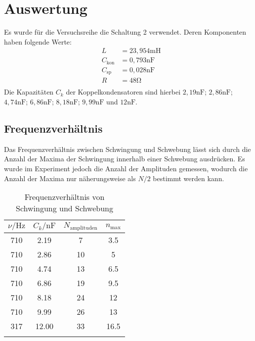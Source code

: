 \section{Auswertung}
\label{sec:Auswertung}

Es wurde für die Versuchsreihe die Schaltung 2 verwendet. Deren Komponenten haben folgende Werte:
\begin{align*}
& L & = 23,954 \si{\milli\henry} \\
& C_\text{kon} & = 0,793 \si{\nano\farad} \\
& C_\text{sp} & = 0,028 \si{\nano\farad} \\
& R & = 48 \si{\ohm} \\
\end{align*}
Die Kapazitäten $C_k$ der Koppelkondensatoren sind hierbei $2,19 \si{\nano\farad}$; $2,86 \si{\nano\farad}$;
$4,74 \si{\nano\farad}$; $6,86 \si{\nano\farad}$; $8,18 \si{\nano\farad}$; $9,99 \si{\nano\farad}$ und
$12 \si{\nano\farad}$.

\subsection{Frequenzverhältnis}
Das Frequenzverhältnis zwischen Schwingung und Schwebung lässt sich durch die Anzahl der Maxima der Schwingung innerhalb
einer Schwebung ausdrücken. Es wurde im Experiment jedoch die Anzahl der Amplituden gemessen, wodurch die Anzahl der 
Maxima nur näherungsweise als $N/2$ bestimmt werden kann.  

\begin{table}
    \centering
    \caption{Frequenzverhältnis von Schwingung und Schwebung}
    \begin{tabular}{c c c c}
        \toprule
        {$\nu / \si{\hertz}$} & {$C_k / \si{\nano\farad}$} & {$N_\text{amplituden}$} & $n_\text{max}$ \\
        \midrule
        710 &  2.19 &  7 &  3.5 \\  
        710 &  2.86 & 10 &  5   \\
        710 &  4.74 & 13 &  6.5 \\
        710 &  6.86 & 19 &  9.5 \\
        710 &  8.18 & 24 & 12   \\
        710 &  9.99 & 26 & 13   \\
        317 & 12.00 & 33 & 16.5 \\
        \bottomrule
        \label{tab:a}
    \end{tabular}
\end{table}

